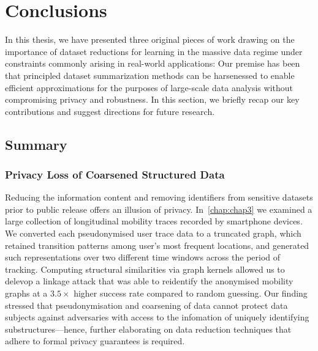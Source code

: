 \chapter{Conclusions}
\label{chap:chap6}
\renewcommand*{\MyPath}{../Chapter6}%
\newcommand{\etal}{\textit{et al}.}
\newcommand{\ie}{\textit{i}.\textit{e}.}

In this thesis, we have presented three original pieces of work drawing on the importance of dataset reductions for learning in the massive data regime under constraints commonly arising in real-world applications: Our premise has been that principled dataset summarization methods can be harsenessed to enable efficient approximations for the purposes of large-scale data analysis without compromising privacy and robustness. In this section, we briefly recap our key contributions and suggest directions for future research.

\section{Summary}
\label{sec:summary}


\subsection{Privacy Loss of Coarsened Structured Data}
\label{subsec:ch3-summary}
Reducing the information content and removing identifiers from sensitive datasets prior to public release offers an illusion of privacy. In~\cref{chap:chap3} we examined a large collection of longitudinal mobility traces recorded by smartphone devices. We converted each pseudonymised user trace data to a truncated graph, which retained transition patterns among user's most frequent locations, and generated such representations over two different time windows across the period of tracking. Computing structural similarities via graph kernels allowed us to delevop a linkage attack that was able to reidentify the anonymised mobility graphs at a $3.5\times$ higher success rate compared to random guessing. Our finding stressed that pseudonymisation and coarsening of data cannot protect data subjects against adversaries with access to the infomation of uniquely identifying substructures---hence, further elaborating on data reduction techniques that adhere to formal privacy guarantees is required.

